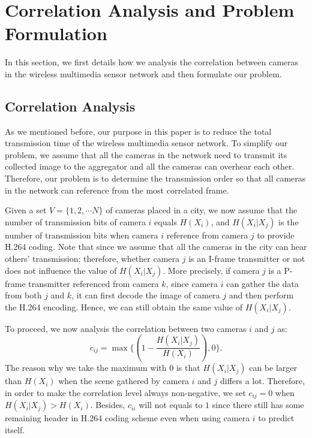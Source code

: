 \section{Correlation Analysis and Problem Formulation}
\label{sec:CorrelationAnalysisandProblemFormulation}
In this section, we first details how we analysis the correlation between
cameras in the wireless multimedia sensor network and then formulate our
problem.
\subsection{Correlation Analysis}
\label{sec:CorrelationAnalysis}
As we mentioned before, our purpose in this paper is to reduce the total
transmission time of the wireless multimedia sensor network.
To simplify our problem, we assume that all the cameras in the network need to
transmit its collected image to the aggregator and all the cameras can
overhear each other.
Therefore, our problem is to determine the transmission order so that all
cameras in the network can reference from the most correlated frame.

Given a set $V=\{1,2, \cdots N \}$ of cameras placed in a city, we now assume
that the number of transmission bits of camera $i$ equals $H(X_{i})$, and
$H(X_{i}|X_{j})$ is the number of transmission bits when camera $i$ reference
from camera $j$ to provide H.264 coding.
Note that since we assume that all the cameras in the city can hear others'
transmission; therefore, whether camera $j$ is an I-frame transmitter or not
does not influence the value of $H(X_{i}|X_{j})$.
More precisely, if camera $j$ is a P-frame transmitter referenced from camera
$k$, since camera $i$ can gather the data from both $j$ and $k$, it can first
decode the image of camera $j$ and then perform the H.264 encoding.
Hence, we can still obtain the same value of $H(X_{i}|X_{j})$.

To proceed, we now analysis the correlation between two cameras $i$ and $j$ as:
\begin{equation}
c_{ij} = \max \{ (1-\frac{H(X_{i}|X_{j})}{H(X_{i})}),0 \}.
\label{eq:correlationAnalysis}
\end{equation}
The reason why we take the maximum with $0$ is that $H(X_{i}|X_{j})$ can be
larger than $H(X_{i})$ when the scene gathered by camera $i$ and $j$ differs a
lot.
Therefore, in order to make the correlation level always non-negative, we set
${c_{ij}=0}$ when ${H(X_{i}|X_{j})>H(X_{i})}$.
Besides, $c_{ii}$ will not equals to $1$ since there still has some remaining
header in H.264 coding scheme even when using camera $i$ to predict itself. 

